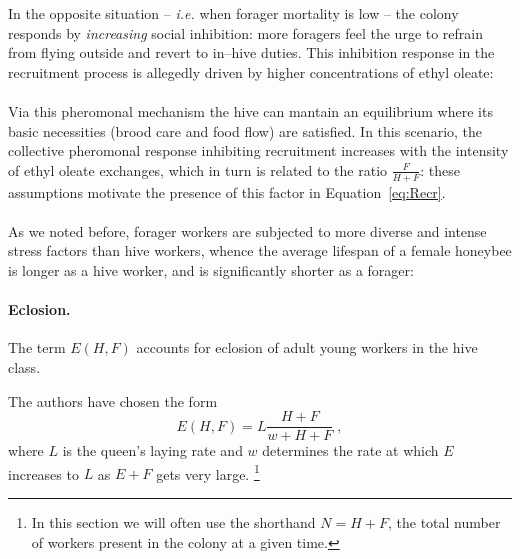 In the opposite situation -- \emph{i.e.} when forager mortality is low -- the colony responds by \emph{increasing} social inhibition: more foragers feel the urge to refrain from flying outside and revert to in--hive duties.
This inhibition response in the recruitment process is allegedly driven by higher concentrations of ethyl oleate:

\paragraph{}
Via this pheromonal mechanism the hive can mantain an equilibrium where its basic necessities (brood care and food flow) are satisfied.
In this scenario, the collective pheromonal response inhibiting recruitment increases with the intensity of ethyl oleate exchanges, which in turn is related to the ratio $\frac{F}{H+F}$: these assumptions motivate the presence of this factor in Equation~\eqref{eq:Recr}.

\paragraph{}
As we noted before, forager workers are subjected to more diverse and intense stress factors than hive workers, whence the average lifespan of a female honeybee is longer as a hive worker, and is significantly shorter as a forager: 

\paragraph{Eclosion.}
The term $E(H,F)$ accounts for eclosion of adult young workers in the hive class.

The authors have chosen the form
\begin{equation}
    \label{eq:eclos}
    E(H,F) = L \frac{H+F}{w + H + F} \; ,
\end{equation}
where $L$ is the queen's laying rate and $w$ determines the rate at which $E$ increases to $L$ as $E+F$ gets very large.
\footnote{In this section we will often use the shorthand $N=H+F$, the total number of workers present in the colony at a given time.}

